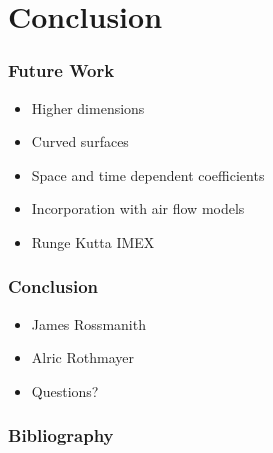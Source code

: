 \documentclass[10pt]{beamer}
\begin{document}
  \section{Conclusion}
    \begin{frame}
      \frametitle{Future Work}
      \begin{itemize}
        \item Higher dimensions
        \item Curved surfaces
        \item Space and time dependent coefficients
        \item Incorporation with air flow models
        \item Runge Kutta IMEX
      \end{itemize}
    \end{frame}

    \begin{frame}
      \frametitle{Conclusion}
      \begin{itemize}
        \item James Rossmanith
        \item Alric Rothmayer
        \item Questions?
      \end{itemize}
    \end{frame}

    \begin{frame}
      \frametitle{Bibliography}
      \nocite{*}
      \printbibliography{}
    \end{frame}
\end{document}
